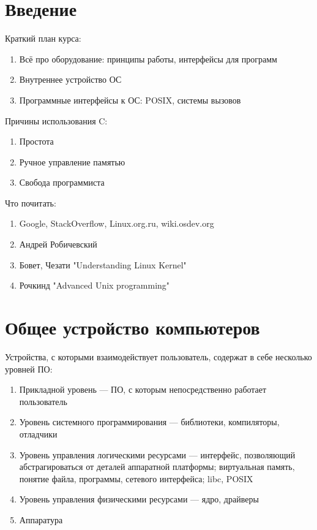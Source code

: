\documentclass[main]{subfiles}
\begin{document}
\chapter{Введение}
Краткий план курса:
\begin{enumerate}
\item Всё про оборудование: принципы работы, интерфейсы для программ
\item Внутреннее устройство ОС
\item Программные интерфейсы к ОС: POSIX, системы вызовов
\end{enumerate}


Причины использования C:
\begin{enumerate}
\item Простота
\item Ручное управление памятью
\item Свобода программиста
\end{enumerate}

Что почитать:
\begin{enumerate}
\item Google, StackOverflow, Linux.org.ru, wiki.osdev.org
\item Андрей Робичевский
\item Бовет, Чезати "Understanding Linux Kernel"
\item Рочкинд "Advanced Unix programming"
\end{enumerate}

\chapter{Общее устройство компьютеров}
Устройства, с которыми взаимодействует пользователь, содержат в себе
несколько уровней ПО:
\begin{enumerate}
\item Прикладной уровень --- ПО, с которым непосредственно работает пользователь
\item Уровень системного программирования --- библиотеки, компиляторы, отладчики
\item Уровень управления логическими ресурсами --- интерфейс, позволяющий абстрагироваться
от деталей аппаратной платформы; виртуальная память, понятие файла, программы, сетевого
интерфейса; libc, POSIX
\item Уровень управления физическими ресурсами --- ядро, драйверы
\item Аппаратура
\end{enumerate}
\end{document}
